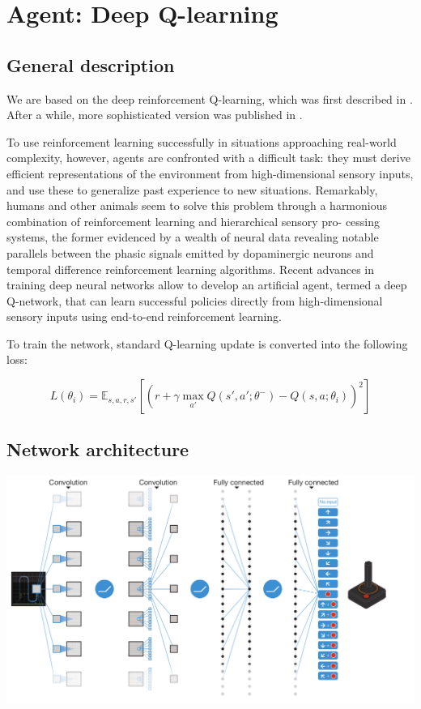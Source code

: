 \documentclass{article}
\begin{document}
\section{Agent: Deep Q-learning}

\subsection{General description}

We are based on the deep reinforcement
Q-learning, which was first described in \cite{mnih2013playing}.
After a while, more sophisticated version was published in
\cite{mnih2015humanlevel}.

 To use reinforcement learning successfully in situations
approaching real-world complexity, however, agents are confronted
with a difficult task: they must derive efficient representations of the
environment from high-dimensional sensory inputs, and use these
to generalize past experience to new situations. Remarkably, humans
and other animals seem to solve this problem through a harmonious
combination of reinforcement learning and hierarchical sensory pro-
cessing systems, the former evidenced by a wealth of neural data
revealing notable parallels between the phasic signals emitted by
dopaminergic neurons and temporal difference reinforcement learning
algorithms. Recent advances in training deep neural networks allow to
develop an artificial agent, termed a deep Q-network, that can
learn successful policies directly from high-dimensional sensory inputs
using end-to-end reinforcement learning.

To train the network, standard Q-learning update is converted into the
following loss:

$$L(\theta_i) = \mathbb{E}_{s,a,r,s'} \left[ \left(r + \gamma \max_{a'}Q(s', a'; \theta^{-}) - Q(s, a; \theta_i) \right)^2 \right] $$

\subsection{Network architecture}

\includegraphics[scale=0.3]{dqn_crop.png}
\end{document}
